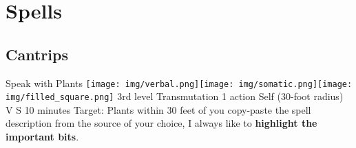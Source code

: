 \def\Verbal{\texttt{[image: img/verbal.png]}}
\def\Somatic{\texttt{[image: img/somatic.png]}}
\def\Material{\texttt{[image: img/material.png]}}
\def\Valuable{\texttt{[image: img/valuable\_material.png]}} %

\def\Action{\texttt{[image: img/filled\_square.png]}}
\def\Bonus{\texttt{[image: img/empty\_square.png]}}
\def\Ritual{\texttt{[image: img/filled\_square.png]}} %

\section*{Spells}

\subsection*{Cantrips}

\DndSpellHeader
  {Speak with Plants \hfill \Verbal \Somatic \Action}
  {3rd level Transmutation}
  {1 action}
  {Self (30-foot radius)}
  {V S}
  {10 minutes}
  {Target: Plants within 30 feet of you}
    copy-paste the spell description from the source of your choice, I always like to \textbf{highlight the important bits}.
